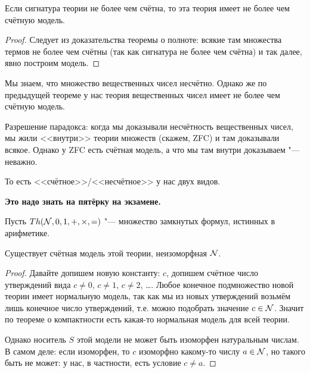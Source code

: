 \begin{theorem}\label{lowenheim}
	Если сигнатура теории не более чем счётна, то эта теория имеет не более чем счётную модель.
\end{theorem}
\begin{proof}
	Следует из доказательства теоремы о полноте: всякие там множества термов не более чем счётны
	(так как сигнатура не более чем счётна) и так далее, явно построим модель.
\end{proof}
\begin{Rem}
	Мы знаем, что множество вещественных чисел несчётно.
	Однако же по предыдущей теореме у нас теория вещественных чисел имеет не более чем счётную модель.

	Разрешение парадокса: когда мы доказывали несчётность вещественных чисел, мы жили
	<<внутри>> теории множеств (скажем, ZFC) и там доказывали всякое.
	Однако у ZFC есть счётная модель, а что мы там внутри доказываем "--- неважно.

	То есть <<счётное>>/<<несчётное>> у нас двух видов.

	\textbf{Это надо знать на пятёрку на экзамене.}
\end{Rem}

\begin{assertion}
	Пусть $Th(\mathcal{N}, 0, 1, +, \times, =)$ "--- множество замкнутых формул,
	истинных в арифметике.

	Существует счётная модель этой теории, неизоморфная $\mathcal{N}$.
\end{assertion}
\begin{proof}
	Давайте допишем новую константу: $c$, допишем счётное число утверждений вида $c \neq 0$, $c \neq 1$, $c \neq 2$, \dots.
	Любое конечное подмножество новой теории имеет нормальную модель, так как мы из новых утверждений
	возьмём лишь конечное число утверждений, т.е. можно подобрать значение $c \in \mathcal{N}$.
	Значит по теореме о компактности есть какая-то нормальная модель для всей теории.

	Однако носитель $S$ этой модели не может быть изоморфен натуральным числам.
	В самом деле: если изоморфен, то $c$ изоморфно какому-то числу $a \in \mathcal{N}$,
	но такого быть не может: у нас, в частности, есть условие $c \neq a$.
\end{proof}
